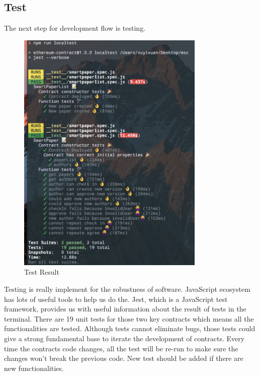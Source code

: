\documentclass[openany,12pt]{ecsthesis}      %
\begin{document}
\subsection{Test}
The next step for development flow is testing.
\begin{figure}[H]
  \centering
  \includegraphics[width=0.8\textwidth]{test.png}
  \caption{Test Result}
  \label{test} 
\end{figure}
Testing is really implement for the robustness of software. 
JavaScript ecosystem has lots of useful tools to help us do the.
Jest, which is a JavaScript test framework, 
provides us with useful information about the result of tests in the terminal.
There are 19 unit tests for those two key contracts which means all the functionalities are tested. Although tests cannot eliminate bugs,
those tests could give a strong fundamental base to iterate the development of contracts. Every time the contracts code changes, 
all the test will be re-run to make sure the changes won't break the previous code. 
New test should be added if there are new functionalities.
\end{document}
